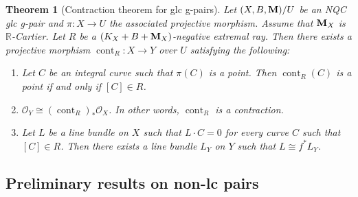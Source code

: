 \documentclass[11pt]{amsart}
\numberwithin{equation}{section}
\newcommand{\Mm}{{\bf{M}}}
\newcommand{\Qq}{\mathbb{Q}}
\newcommand{\Rr}{\mathbb{R}}
\newcommand{\cont}{\operatorname{cont}}
\newtheorem{thm}{Theorem}[section]
\theoremstyle{definition}
\theoremstyle{definition}
\newtheorem{rem}[thm]{Remark}
\theoremstyle{definition}
\begin{document}
\begin{thm}[Contraction theorem for glc g-pairs]\label{thm: contraction theorem glc g-pairs}
Let $(X,B,\Mm)/U$ be an NQC glc g-pair and $\pi: X\rightarrow U$ the associated projective morphism. Assume that $\Mm_X$ is $\Rr$-Cartier. Let $R$ be a $(K_X+B+\Mm_X)$-negative extremal ray. Then there exists a projective morphism $\cont_R: X\rightarrow Y$ over $U$ satisfying the following:
\begin{enumerate}
    \item Let $C$ be an integral curve such that $\pi(C)$ is a point. Then $\cont_R(C)$ is a point if and only if $[C]\in R$.
    \item $\mathcal{O}_Y\cong(\cont_R)_*\mathcal{O}_X$. In other words, $\cont_R$ is a contraction.
    \item Let $L$ be a line bundle on $X$ such that $L\cdot C=0$ for every curve $C$ such that $[C]\in R$. Then there exists a line bundle $L_Y$ on $Y$ such that $L\cong f^*L_Y$.
\end{enumerate}
\end{thm}

\begin{comment}
\begin{rem}
\begin{enumerate}
    \item In Theorem \ref{thm: base-point-free theorem for glc pairs}, it is easy to check that the condition ``$qL-(K_X+B+\Mm_X+A)$ is $\pi$-ample" is equivalent to the condition ``$qL-(K_X+B+\Mm_X+A)$ is $\pi$-nef", and is also equivalent to the condition ``$qL-(K_X+B+\Mm_X)$ is $\pi$-ample". We choose to use ``$qL-(K_X+B+\Mm_X+A)$ is $\pi$-ample" because this is the most convenient condition when applying induction on the dimension.
    \item There are some technical difficulties if we want to replace ``$L$ is $\pi$-semi-ample" with ``$mL$ is $\pi$-generated for any $m\gg 0$ when $L$ is Cartier" in Theorem \ref{thm: base-point-free theorem for glc pairs}, or if we want to replace ``$L\sim_{\Qq}f^*L_Y$" with ``$L\sim f^*L_Y$ for some Cartier divisor $L_Y$ when $L$ is Cartier" in Theorem \ref{thm: contraction theorem glc g-pairs}. Nevertheless, our theorems are still strong enough for us to run the minimal model program.
\end{enumerate}
\end{rem}
\end{comment}

\subsection{Preliminary results on non-lc pairs}
\end{document}
